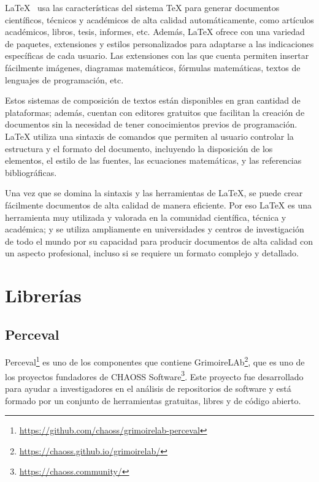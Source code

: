 \documentclass[a4paper, 12pt]{book}
\begin{document}
LaTeX~\cite{rodriguez2014edicion} usa las características del sistema TeX para generar documentos científicos, técnicos y académicos de alta calidad automáticamente, como artículos académicos, libros, tesis, informes, etc.   
Además, LaTeX ofrece con una variedad de paquetes, extensiones y estilos personalizados para adaptarse a las indicaciones específicas de cada usuario.
Las extensiones con las que cuenta permiten insertar fácilmente imágenes, diagramas matemáticos, fórmulas matemáticas, textos de lenguajes de programación, etc.


Estos sistemas de composición de textos están disponibles en gran cantidad de plataformas; además, cuentan con editores gratuitos que facilitan la creación de documentos sin la necesidad de tener conocimientos previos de programación.
LaTeX utiliza una sintaxis de comandos que permiten al usuario controlar la estructura y el formato del documento, incluyendo la disposición de los elementos, el estilo de las fuentes, las ecuaciones matemáticas, y las referencias bibliográficas. 


Una vez que se domina la sintaxis y las herramientas de LaTeX, se puede crear fácilmente documentos de alta calidad de manera eficiente.
Por eso LaTeX es una herramienta muy utilizada y valorada en la comunidad científica, técnica y académica; y se utiliza ampliamente en universidades y centros de investigación de todo el mundo por su capacidad para producir documentos de alta calidad con un aspecto profesional, incluso si se requiere un formato complejo y detallado. 


\section{Librerías} %
\label{sec:librerías}

\subsection{Perceval} %
\label{sec:perceval} %


Perceval\footnote{\url{https://github.com/chaoss/grimoirelab-perceval}} es uno de los componentes que contiene GrimoireLAb\footnote{\url{https://chaoss.github.io/grimoirelab/}}, que es uno de los proyectos fundadores de CHAOSS Software\footnote{\url{https://chaoss.community/}}.
Este proyecto fue desarrollado para ayudar a investigadores en el análisis de repositorios de software y está formado por un conjunto de herramientas gratuitas, libres y de código abierto. 
\end{document}
